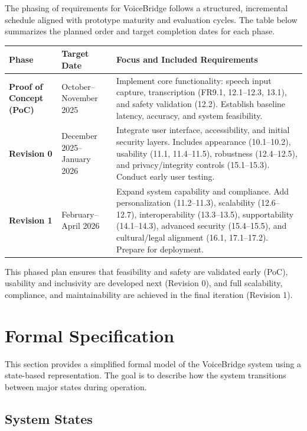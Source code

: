 \documentclass[11pt]{article}
\begin{document}
The phasing of requirements for VoiceBridge follows a structured, incremental schedule aligned with prototype maturity and evaluation cycles. The table below summarizes the planned order and target completion dates for each phase.

\begin{table}[h!]
\centering
\begin{tabular}{p{3cm}p{4cm}p{7cm}}
\toprule
\textbf{Phase} & \textbf{Target Date} & \textbf{Focus and Included Requirements} \\
\midrule
\textbf{Proof of Concept (PoC)} & October--November 2025 &
Implement core functionality: speech input capture, transcription (FR9.1, 12.1–12.3, 13.1), and safety validation (12.2). Establish baseline latency, accuracy, and system feasibility. \\

\textbf{Revision 0} & December 2025--January 2026 &
Integrate user interface, accessibility, and initial security layers. Includes appearance (10.1–10.2), usability (11.1, 11.4–11.5), robustness (12.4–12.5), and privacy/integrity controls (15.1–15.3). Conduct early user testing. \\

\textbf{Revision 1} & February--April 2026 &
Expand system capability and compliance. Add personalization (11.2–11.3), scalability (12.6–12.7), interoperability (13.3–13.5), supportability (14.1–14.3), advanced security (15.4–15.5), and cultural/legal alignment (16.1, 17.1–17.2). Prepare for deployment. \\
\bottomrule
\end{tabular}
\label{tab:req-timeline}
\end{table}

\noindent This phased plan ensures that feasibility and safety are validated early (PoC), usability and inclusivity are developed next (Revision 0), and full scalability, compliance, and maintainability are achieved in the final iteration (Revision 1).




\section{Formal Specification}

This section provides a simplified formal model of the VoiceBridge system using a state-based representation.  
The goal is to describe how the system transitions between major states during operation.

\subsection{System States}
\end{document}
